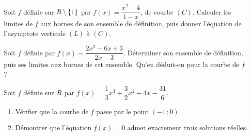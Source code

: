 \begin{annales}
Soit $f$ définie sur $R\setminus\{1\}$ par $f(x) = \dfrac{x^{2}-4}{1-x}$, de
courbe $(C)$. Calculer les limites de $f$ aux bornes de son ensemble de
définition, puis donner l'équation de l'asymptote verticale $(L)$ à $(C)$.

Soit $f$ définie par $f(x) = \dfrac{2x^{2}-6x+3}{2x-3}$. Déterminer son
ensemble de définition, puis ses limites aux bornes de cet ensemble. Qu'en
déduit-on pour la courbe de $f$ ?

Soit $f$ définie sur $R$ par
$f(x) = \dfrac{1}{3}x^{3}+\dfrac{3}{2}x^{2}-4x-\dfrac{31}{6}$.
\begin{enumerate}[label=\textbf{\alph*)}, leftmargin=*, itemsep=0.15em]
  \item Vérifier que la courbe de $f$ passe par le point $(-1\,;0)$.
  \item Démontrer que l'équation $f(x) = 0$ admet exactement trois solutions
        réelles.
\end{enumerate}

\medskip
{}
\end{annales}

